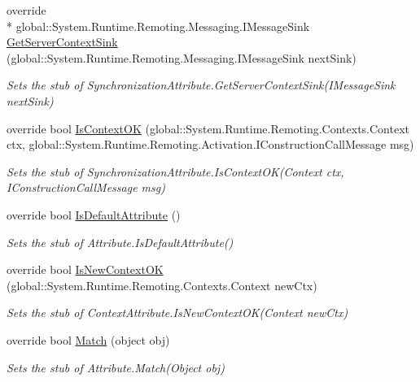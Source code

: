 \begin{DoxyCompactItemize}
override \\*
global\-::\-System.\-Runtime.\-Remoting.\-Messaging.\-I\-Message\-Sink \hyperlink{class_system_1_1_runtime_1_1_remoting_1_1_contexts_1_1_fakes_1_1_stub_synchronization_attribute_a1e4c230ee65dde7642d9fa9a9957eebe}{Get\-Server\-Context\-Sink} (global\-::\-System.\-Runtime.\-Remoting.\-Messaging.\-I\-Message\-Sink next\-Sink)
\begin{DoxyCompactList}\small\item\em Sets the stub of Synchronization\-Attribute.\-Get\-Server\-Context\-Sink(\-I\-Message\-Sink next\-Sink)\end{DoxyCompactList}\item 
override bool \hyperlink{class_system_1_1_runtime_1_1_remoting_1_1_contexts_1_1_fakes_1_1_stub_synchronization_attribute_af7dca1f2e56cf958fa17cca87de374fd}{Is\-Context\-O\-K} (global\-::\-System.\-Runtime.\-Remoting.\-Contexts.\-Context ctx, global\-::\-System.\-Runtime.\-Remoting.\-Activation.\-I\-Construction\-Call\-Message msg)
\begin{DoxyCompactList}\small\item\em Sets the stub of Synchronization\-Attribute.\-Is\-Context\-O\-K(\-Context ctx, I\-Construction\-Call\-Message msg)\end{DoxyCompactList}\item 
override bool \hyperlink{class_system_1_1_runtime_1_1_remoting_1_1_contexts_1_1_fakes_1_1_stub_synchronization_attribute_a4efac3d2235845c9b46767c3f68a9b88}{Is\-Default\-Attribute} ()
\begin{DoxyCompactList}\small\item\em Sets the stub of Attribute.\-Is\-Default\-Attribute()\end{DoxyCompactList}\item 
override bool \hyperlink{class_system_1_1_runtime_1_1_remoting_1_1_contexts_1_1_fakes_1_1_stub_synchronization_attribute_a206c7dacfd72d8bffb0de31d8557a2c3}{Is\-New\-Context\-O\-K} (global\-::\-System.\-Runtime.\-Remoting.\-Contexts.\-Context new\-Ctx)
\begin{DoxyCompactList}\small\item\em Sets the stub of Context\-Attribute.\-Is\-New\-Context\-O\-K(\-Context new\-Ctx)\end{DoxyCompactList}\item 
override bool \hyperlink{class_system_1_1_runtime_1_1_remoting_1_1_contexts_1_1_fakes_1_1_stub_synchronization_attribute_a98809e9af81793a24dfd1b59fc861163}{Match} (object obj)
\begin{DoxyCompactList}\small\item\em Sets the stub of Attribute.\-Match(\-Object obj)\end{DoxyCompactList}\end{DoxyCompactItemize}
